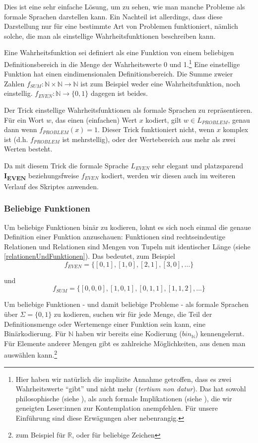 Dies ist eine sehr einfache Lösung, um zu sehen,
wie man manche Probleme als formale Sprachen darstellen kann.
Ein Nachteil ist allerdings, dass diese Darstellung
nur für eine bestimmte Art von Problemen funktioniert,
nämlich solche, die man als einstellige Wahrheitsfunktionen beschreiben kann.


Eine Wahrheitsfunktion sei definiert als eine Funktion von einem beliebigen Definitionsbereich
in die Menge der Wahrheitswerte 0 und 1.\footnote{
    Hier haben wir natürlich die implizite Annahme getroffen,
    dass es zwei Wahrheitswerte ``gibt'' und nicht mehr (\emph{tertium non datur}).
    Das hat sowohl philosophische (siehe \cite{sep-logic-manyvalued}), als auch formale Implikationen (siehe \cite{gottwald}),
    die wir geneigten Leser:innen zur Kontemplation anempfehlen.
    Für unsere Einführung sind diese Erwägungen aber nebenrangig.
}
Eine einstellige Funktion hat einen eindimensionalen Definitionsbereich.
Die Summe zweier Zahlen $f_{SUM}: \mathbb{N} \times \mathbb{N} \rightarrow \mathbb{N}$
ist zum Beispiel weder eine Wahrheitsfunktion,
noch einstellig.
$f_{EVEN}: \mathbb{N} \rightarrow \{0,1\}$ dagegen ist beides.

Der Trick einstellige Wahrheitsfunktionen als formale Sprachen zu repräsentieren.
Für ein Wort $w$, das einen (einfachen) Wert $x$ kodiert,
gilt $w \in L_{PROBLEM}$, genau dann wenn $f_{PROBLEM}(x) = 1$.
Dieser Trick funktioniert nicht,
wenn $x$ komplex ist (d.h. $f_{PROBLEM}$ ist mehrstellig),
oder der Wertebereich aus mehr als zwei Werten besteht.

Da mit diesem Trick die formale Sprache $L_{EVEN}$ sehr elegant und platzsparend
\textbf{I\textsubscript{EVEN}} beziehungsfweise $f_{EVEN}$ kodiert,
werden wir diesen auch im weiteren Verlauf des Skriptes anwenden.

\subsubsection{Beliebige Funktionen}
Um beliebige Funktionen binär zu kodieren,
lohnt es sich noch einmal die genaue Definition einer Funktion anzuschauen:
Funktionen sind rechtseindeutige Relationen und Relationen sind Mengen von Tupeln mit identischer Länge (siehe \autoref{relationenUndFunktionen}).
Das bedeutet, zum Beispiel 
\[
    f_{EVEN} = \{ [0,1], [1,0], [2,1], [3,0], \ldots \}
\]

und
\[
    f_{SUM} = \{ [0,0,0], [1,0,1], [0,1,1], [1,1,2], \ldots \}
\]

Um beliebige Funktionen - und damit beliebige Probleme -
als formale Sprachen über $\Sigma = \{0,1\}$ zu kodieren,
suchen wir für jede Menge,
die Teil der Definitionsmenge oder Wertemenge einer Funktion sein kann,
eine Binärkodierung.
Für $\mathbb{N}$
haben wir bereits eine Kodierung ($bin_{\mathbb{N}}$) kennengelernt.
Für Elemente anderer Mengen gibt es zahlreiche Möglichkeiten,
aus denen man auswählen kann.\footnote{
    zum Beispiel \cite{ieee754} für $\mathbb{R}$,
    oder \cite{RFC3629} für beliebige Zeichen
}\\

